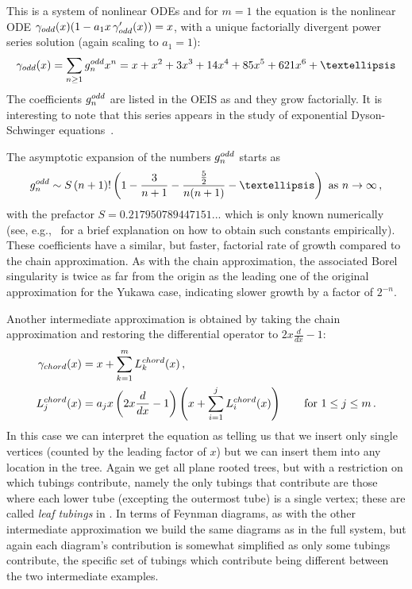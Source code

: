 \documentclass[oneside]{amsart}
\theoremstyle{definition}
\begin{document}
This is a system of nonlinear ODEs and for $m=1$ the equation is the nonlinear ODE $\gamma_{\rm odd}(x)(1-a_1 x\, \gamma_{\rm odd}^\prime(x))=x$, with a unique factorially divergent power series solution (again scaling to $a_1=1$):
\[
    \gamma_{\rm odd}(x)= \sum_{n\geq1} g^{\rm odd}_n x^n = x+x^2+3x^3+14x^4+85x^5+621x^6+\dots
\]
The coefficients $g^{\rm odd}_n$ are listed in the OEIS as \cite[\href{https://oeis.org/A088716}{A088716}]{oeis}
and they grow factorially. It is interesting to note that this series appears in the study of exponential Dyson-Schwinger equations~\cite{PHB}.

The asymptotic expansion of the numbers $g^{\rm odd}_n$ starts as
\[
    g^{\rm odd}_n\sim S\, (n+1)!\left(1-\frac{3}{n+1}-\frac{\frac{5}{2}}{n(n+1)}-\dots\right) \text{ as } n \rightarrow \infty\,,
\]
with the prefactor $S=0.217950789447151...$ which is only known numerically (see, e.g.,~\cite[Appendix~A]{BDM} for a brief explanation on how to obtain such constants empirically). 
These coefficients have a similar, but faster, factorial rate of growth compared to the chain approximation.
%
As with the chain approximation, the associated Borel singularity is twice as far from the origin as the leading one of the original approximation for the Yukawa case, indicating slower growth by a factor of $2^{-n}$. 

Another intermediate approximation is obtained by taking the chain approximation and restoring the differential operator to $2x\frac{d}{dx}-1$:
  \begin{align} \gamma_{\rm chord}(x) & = x + \sum_{k=1}^m L_k^{\rm chord}(x)\,, \\
 L_j^{\rm chord}(x) & = a_j x \left(2x\frac{d}{dx}-1\right)\left(x + \sum_{i=1}^{j}L_i^{\rm chord}(x)\right) \qquad \text{for $1\leq j\leq m$}\,. \label{eq:approx2} \end{align}
In this case we can interpret the equation as telling us that we insert only single vertices (counted by the leading factor of $x$) but we can insert them into any location in the tree.  Again we get all plane rooted trees, but with a restriction on which tubings contribute, namely the only tubings that contribute are those where each lower tube (excepting the outermost tube) is a single vertex; these are called \emph{leaf tubings} in \cite{BCEFNOHY}.  In terms of Feynman diagrams, as with the other intermediate approximation we build the same diagrams as in the full system, but again each diagram's contribution is somewhat simplified as only some tubings contribute, the specific set of tubings which contribute being different between the two intermediate examples.
\end{document}
